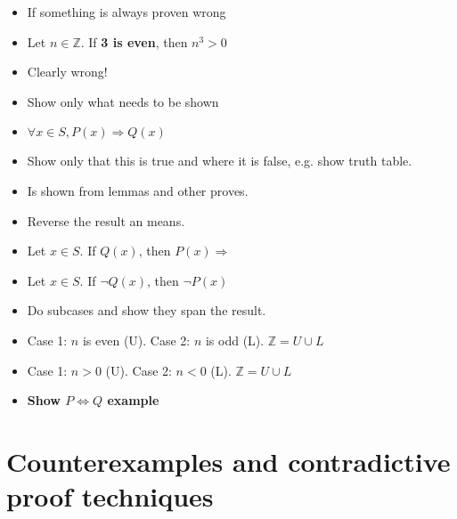 \documentclass[english,10pt,a4paper]{article}
\begin{document}
\begin{theo} 
\begin{itemize}
\item If something is always proven wrong
\item Let $n \in \mathbb{Z}$. If \textbf{3 is even}, then $n^3 > 0$
\item[] Clearly wrong!
\end{itemize}
\end{theo}



\begin{theo} 
\begin{itemize}
\item Show only what needs to be shown
\item $\forall x \in S, P(x) \Rightarrow Q(x)$
\item[] Show only that this is true and where it is false, e.g. show truth table.
\item Is shown from lemmas and other proves.
\end{itemize}
\end{theo}



\begin{theo} 
\begin{itemize}
\item Reverse the result an means.
\item Let $x \in S$. If $Q(x)$, then $P(x) \Rightarrow$
\item[] Let $x \in S$. If $\neg Q(x)$, then $\neg P(x)$
\end{itemize}
\end{theo}



\begin{theo} 
\begin{itemize}
\item Do subcases and show they span the result.
\item Case 1: $n$ is even (U). Case 2: $n$ is odd (L). $\mathbb{Z} = U \cup L $
\item Case 1: $n>0$ (U). Case 2: $n<0$ (L). $\mathbb{Z} = U \cup L$
\item \textbf{Show $P \Leftrightarrow Q$ example}
\end{itemize}
\end{theo}


\newpage
\section{Counterexamples and contradictive proof techniques}
\end{document}
